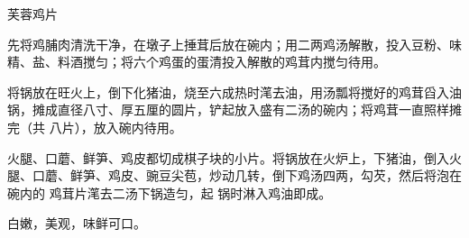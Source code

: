 %
%
%
%
%
%
%
\begin{recipe}{芙蓉鸡片}

\ingredients


\preparation

\step 先将鸡脯肉清洗干净，在墩子上捶茸后放在碗内；用二两鸡汤解散，投入豆粉、味
精、盐、料酒搅匀；将六个鸡蛋的蛋清投入解散的鸡茸内搅匀待用。

\step 将锅放在旺火上，倒下化猪油，烧至六成热时滗去油，用汤瓢将搅好的鸡茸舀入油
锅，摊成直径八寸、厚五厘的圆片，铲起放入盛有二汤的碗内；将鸡茸一直照样摊完（共
八片），放入碗内待用。

\step 火腿、口蘑、鲜笋、鸡皮都切成棋子块的小片。将锅放在火炉上，下猪油，倒入火
腿、口蘑、鲜笋、鸡皮、豌豆尖苞，炒动几转，倒下鸡汤四两，勾芡，然后将泡在碗内的
鸡茸片滗去二汤下锅造匀，起 锅时淋入鸡油即成。

\features

白嫩，美观，味鲜可口。

\end{recipe}

